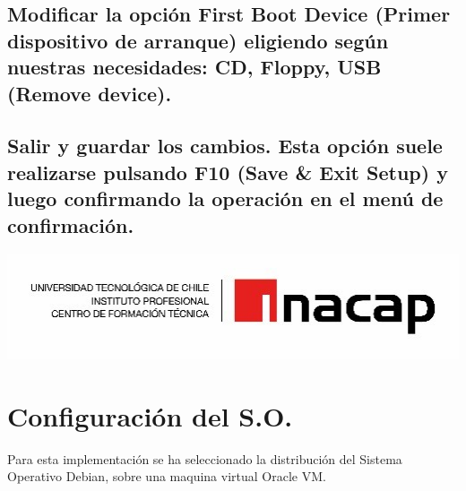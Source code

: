 \documentclass[10pt,letterpaper,spanish,numbers=endperiod]{article}
\begin{document}
\subsection{Modificar la opci\'on First Boot Device (Primer dispositivo de arranque) eligiendo seg\'un nuestras necesidades: CD, Floppy, USB (Remove device).} \label{sec:uno_cuatro}
\subsection{Salir y guardar los cambios. Esta opci\'on suele realizarse pulsando F10 (Save & Exit Setup) y luego confirmando la operaci\'on en el men\'u de confirmaci\'on.} \label{sec:uno_cinco}


\pagebreak %
\noindent\begin{minipage}{0.2\textwidth} %
\includegraphics[width=\linewidth]{logo2}
\end{minipage}

\section{Configuraci\'on del S.O.} \label{sec:dos}
Para esta implementaci\'on se ha seleccionado la distribuci\'on del Sistema Operativo Debian, sobre una maquina virtual Oracle VM.
\end{document}
